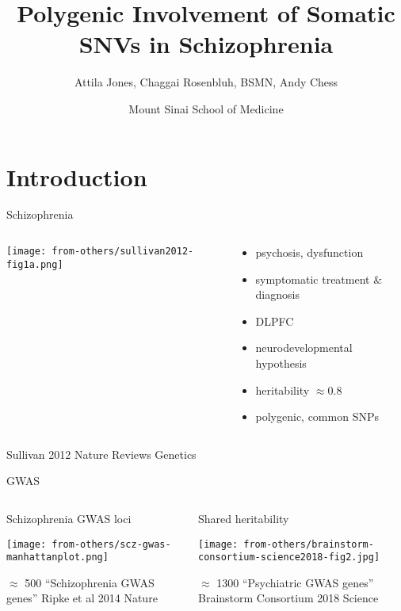 \documentclass[usenames,dvipsnames]{beamer}
\title{Polygenic Involvement of Somatic SNVs in Schizophrenia}
\author{Attila Jones, Chaggai Rosenbluh, BSMN, Andy Chess}
\date{Mount Sinai School of Medicine}
\begin{document}
\maketitle

\section{Introduction}

\begin{frame}{Schizophrenia}
\begin{columns}[t]
\begin{column}{0.4\textwidth}

\texttt{[image: from-others/sullivan2012-fig1a.png]}
\end{column}

\begin{column}{0.6\textwidth}
\begin{itemize}
\item psychosis, dysfunction
\item symptomatic treatment \& diagnosis
\item DLPFC
\item neurodevelopmental hypothesis
\item heritability \(\approx 0.8\)
\item polygenic, common SNPs
\end{itemize}
\end{column}
\end{columns}

{\tiny Sullivan 2012 Nature Reviews Genetics}
\end{frame}

\begin{frame}[label=gwas]{GWAS}

\begin{columns}[t]
\begin{column}{0.5\textwidth}
\begin{center}
Schizophrenia GWAS loci

\texttt{[image: from-others/scz-gwas-manhattanplot.png]}

\footnotesize
\(\approx\) 500 ``Schizophrenia GWAS genes''
{\tiny Ripke et al 2014 Nature}
\end{center}
\end{column}

\begin{column}{0.5\textwidth}
Shared heritability

\texttt{[image: from-others/brainstorm-consortium-science2018-fig2.jpg]}

\footnotesize
\(\approx\) 1300 ``Psychiatric GWAS genes''
{\tiny Brainstorm Consortium 2018 Science}
\end{column}
\end{columns}
\end{frame}
\end{document}
